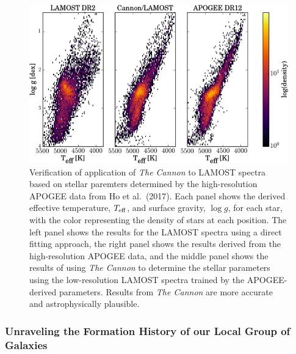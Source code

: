 \documentclass[oneside,11pt]{amsart}
\newcommand{\comment}[2][todo]{{\color{#1}[[{\bf #2}]]}}
\begin{document}
\begin{figure}[h!]
%
\vskip -0.1in
%
\includegraphics[width=\textwidth]{CannonLAMOST.jpg}
%
\caption{\small Verification of application of {\it The Cannon} to
LAMOST spectra based on stellar paremters determined by the
high-resolution APOGEE data from Ho et al.\ (2017).  Each panel shows
the derived effective temperature, $T_{\rm eff}$, and surface gravity,
$\log g$, for each star, with the color representing the density of
stars at each position.  The left panel shows the results for the LAMOST
spectra using a direct fitting approach, the right panel shows the
results derived from the high-resolution APOGEE data, and the middle
panel shows the results of using {\it The Cannon} to determine the
stellar parameters using the low-resolution LAMOST spectra trained by
the APOGEE-derived parameters.  Results from {\it The Cannon} are more
accurate and astrophysically plausible.}
%
\label{fig:Cannon}
%
\end{figure}

\subsubsection{Unraveling the Formation History of our Local Group of Galaxies}
\label{sec:localgroup}
\noindent \comment{1 page}
\end{document}
